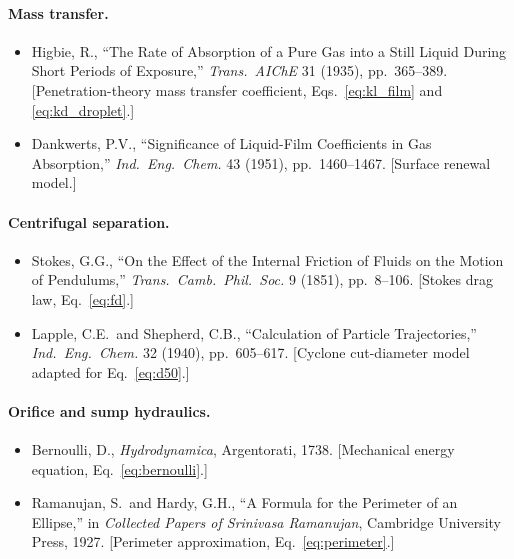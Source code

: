\documentclass[11pt,letterpaper]{article}
\begin{document}
\paragraph{Mass transfer.}
\begin{itemize}[nosep]
  \item Higbie, R., ``The Rate of Absorption of a Pure Gas into a
    Still Liquid During Short Periods of Exposure,''
    \textit{Trans.\ AIChE} 31 (1935), pp.\ 365--389.
    [Penetration-theory mass transfer coefficient,
    Eqs.~\ref{eq:kl_film} and \ref{eq:kd_droplet}.]

  \item Dankwerts, P.V., ``Significance of Liquid-Film Coefficients in
    Gas Absorption,'' \textit{Ind.\ Eng.\ Chem.} 43 (1951),
    pp.\ 1460--1467.  [Surface renewal model.]
\end{itemize}

\paragraph{Centrifugal separation.}
\begin{itemize}[nosep]
  \item Stokes, G.G., ``On the Effect of the Internal Friction of
    Fluids on the Motion of Pendulums,''
    \textit{Trans.\ Camb.\ Phil.\ Soc.} 9 (1851), pp.\ 8--106.
    [Stokes drag law, Eq.~\ref{eq:fd}.]

  \item Lapple, C.E.\ and Shepherd, C.B., ``Calculation of Particle
    Trajectories,'' \textit{Ind.\ Eng.\ Chem.} 32 (1940),
    pp.\ 605--617.  [Cyclone cut-diameter model adapted for
    Eq.~\ref{eq:d50}.]
\end{itemize}

\paragraph{Orifice and sump hydraulics.}
\begin{itemize}[nosep]
  \item Bernoulli, D., \textit{Hydrodynamica}, Argentorati,
    1738.  [Mechanical energy equation, Eq.~\ref{eq:bernoulli}.]

  \item Ramanujan, S.\ and Hardy, G.H., ``A Formula for the Perimeter
    of an Ellipse,'' in \textit{Collected Papers of Srinivasa Ramanujan},
    Cambridge University Press, 1927.
    [Perimeter approximation, Eq.~\ref{eq:perimeter}.]
\end{itemize}
\end{document}
